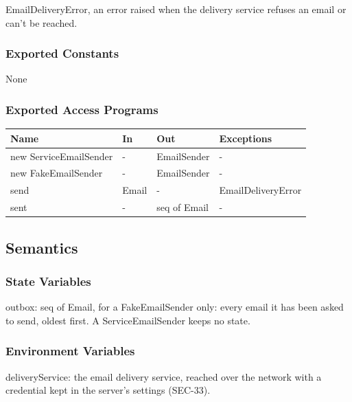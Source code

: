 \documentclass[12pt, titlepage]{article}
\begin{document}
\medskip
\noindent EmailDeliveryError, an error raised when the delivery service refuses
an email or can't be reached.

\subsubsection{Exported Constants}

None

\subsubsection{Exported Access Programs}

\begin{center}
\small
\setlength{\tabcolsep}{3pt}
\begin{tabular}{>{\raggedright\arraybackslash}p{3.9cm}
  >{\raggedright\arraybackslash}p{3.7cm}
  >{\raggedright\arraybackslash}p{3.4cm}
  >{\raggedright\arraybackslash}p{4.3cm}}
\toprule
\textbf{Name} & \textbf{In} & \textbf{Out} & \textbf{Exceptions} \\
\midrule
new ServiceEmailSender & - & EmailSender & - \\
new FakeEmailSender & - & EmailSender & - \\
send & Email & - & EmailDeliveryError \\
sent & - & seq of Email & - \\
\bottomrule
\end{tabular}
\end{center}

\subsection{Semantics}

\subsubsection{State Variables}

\noindent outbox: seq of Email, for a FakeEmailSender only: every email it has
been asked to send, oldest first. A ServiceEmailSender keeps no state.

\subsubsection{Environment Variables}

\noindent deliveryService: the email delivery service, reached over the
network with a credential kept in the server's settings (SEC-33).
\end{document}

